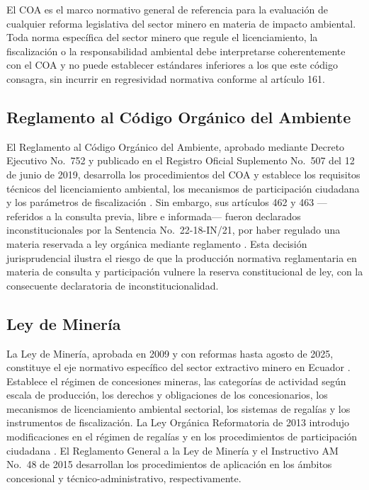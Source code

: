 El COA es el marco normativo general de referencia para la evaluación de cualquier reforma legislativa del sector minero en materia de impacto ambiental. Toda norma específica del sector minero que regule el licenciamiento, la fiscalización o la responsabilidad ambiental debe interpretarse coherentemente con el COA y no puede establecer estándares inferiores a los que este código consagra, sin incurrir en regresividad normativa conforme al artículo 161.

\subsection{Reglamento al Código Orgánico del Ambiente}

El Reglamento al Código Orgánico del Ambiente, aprobado mediante Decreto Ejecutivo No.\ 752 y publicado en el Registro Oficial Suplemento No.\ 507 del 12 de junio de 2019, desarrolla los procedimientos del COA y establece los requisitos técnicos del licenciamiento ambiental, los mecanismos de participación ciudadana y los parámetros de fiscalización \parencite{reglamento_coa_2019}. Sin embargo, sus artículos 462 y 463 ---referidos a la consulta previa, libre e informada--- fueron declarados inconstitucionales por la Sentencia No.\ 22-18-IN/21, por haber regulado una materia reservada a ley orgánica mediante reglamento \parencite{cce_22_18_in_21}. Esta decisión jurisprudencial ilustra el riesgo de que la producción normativa reglamentaria en materia de consulta y participación vulnere la reserva constitucional de ley, con la consecuente declaratoria de inconstitucionalidad.

\subsection{Ley de Minería}

La Ley de Minería, aprobada en 2009 y con reformas hasta agosto de 2025, constituye el eje normativo específico del sector extractivo minero en Ecuador \parencite{ley_mineria_2025}. Establece el régimen de concesiones mineras, las categorías de actividad según escala de producción, los derechos y obligaciones de los concesionarios, los mecanismos de licenciamiento ambiental sectorial, los sistemas de regalías y los instrumentos de fiscalización. La Ley Orgánica Reformatoria de 2013 introdujo modificaciones en el régimen de regalías y en los procedimientos de participación ciudadana \parencite{ley_reformatoria_mineria_2013}. El Reglamento General a la Ley de Minería \parencite{reglamento_general_ley_mineria_2009} y el Instructivo AM No.\ 48 de 2015 \parencite{instructivo_am48_2015} desarrollan los procedimientos de aplicación en los ámbitos concesional y técnico-administrativo, respectivamente.

